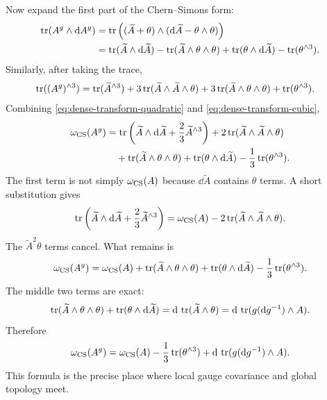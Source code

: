 Now expand the first part of the Chern--Simons form:
\begin{align}
  \operatorname{tr}(A^g\wedge\mathrm{d} A^g)
  &=
  \operatorname{tr}\left((\widetilde A+\theta)\wedge(\mathrm{d}\widetilde A-\theta\wedge\theta)\right)
  \notag\\
  &=
  \operatorname{tr}(\widetilde A\wedge\mathrm{d}\widetilde A)
  -
  \operatorname{tr}(\widetilde A\wedge\theta\wedge\theta)
  +
  \operatorname{tr}(\theta\wedge\mathrm{d}\widetilde A)
  -
  \operatorname{tr}(\theta^{\wedge 3}).
  \label{eq:dense-transform-quadratic}
\end{align}
Similarly, after taking the trace,
\begin{align}
  \operatorname{tr}((A^g)^{\wedge 3})
  &=
  \operatorname{tr}(\widetilde A^{\wedge 3})
  +
  3\operatorname{tr}(\widetilde A\wedge\widetilde A\wedge\theta)
  +
  3\operatorname{tr}(\widetilde A\wedge\theta\wedge\theta)
  +
  \operatorname{tr}(\theta^{\wedge 3}).
  \label{eq:dense-transform-cubic}
\end{align}
Combining \eqref{eq:dense-transform-quadratic} and \eqref{eq:dense-transform-cubic},
\begin{align}
  \omega_{\operatorname{CS}}(A^g)
  &=
  \operatorname{tr}\left(\widetilde A\wedge\mathrm{d}\widetilde A+\frac23\widetilde A^{\wedge 3}\right)
  +
  2\operatorname{tr}(\widetilde A\wedge\widetilde A\wedge\theta)
  \notag\\
  &\quad
  +
  \operatorname{tr}(\widetilde A\wedge\theta\wedge\theta)
  +
  \operatorname{tr}(\theta\wedge\mathrm{d}\widetilde A)
  -
  \frac13\operatorname{tr}(\theta^{\wedge 3}).
  \label{eq:dense-transform-combined}
\end{align}
The first term is not simply $\omega_{\operatorname{CS}}(A)$ because $\dd\widetilde A$ contains $\theta$ terms. A short substitution gives
\begin{equation}
  \operatorname{tr}\left(\widetilde A\wedge\mathrm{d}\widetilde A+\frac23\widetilde A^{\wedge 3}\right)
  =
  \omega_{\operatorname{CS}}(A)
  -
  2\operatorname{tr}(\widetilde A\wedge\widetilde A\wedge\theta).
  \label{eq:dense-transform-tilde}
\end{equation}
The $\widetilde A^2\theta$ terms cancel. What remains is
\begin{equation}
  \omega_{\operatorname{CS}}(A^g)
  =
  \omega_{\operatorname{CS}}(A)
  +
  \operatorname{tr}(\widetilde A\wedge\theta\wedge\theta)
  +
  \operatorname{tr}(\theta\wedge\mathrm{d}\widetilde A)
  -
  \frac13\operatorname{tr}(\theta^{\wedge 3}).
  \label{eq:dense-transform-almost}
\end{equation}
The middle two terms are exact:
\begin{equation}
  \operatorname{tr}(\widetilde A\wedge\theta\wedge\theta)
  +
  \operatorname{tr}(\theta\wedge\mathrm{d}\widetilde A)
  =
  \mathrm{d}\,\operatorname{tr}(\widetilde A\wedge\theta)
  =
  \mathrm{d}\,\operatorname{tr}(g(\mathrm{d} g^{-1})\wedge A).
  \label{eq:dense-transform-exact}
\end{equation}
Therefore
\begin{equation}
  \omega_{\operatorname{CS}}(A^g)
  =
  \omega_{\operatorname{CS}}(A)
  -
  \frac13\operatorname{tr}(\theta^{\wedge 3})
  +
  \mathrm{d}\,\operatorname{tr}(g(\mathrm{d} g^{-1})\wedge A).
  \label{eq:dense-transform-final}
\end{equation}
This formula is the precise place where local gauge covariance and global topology meet.

